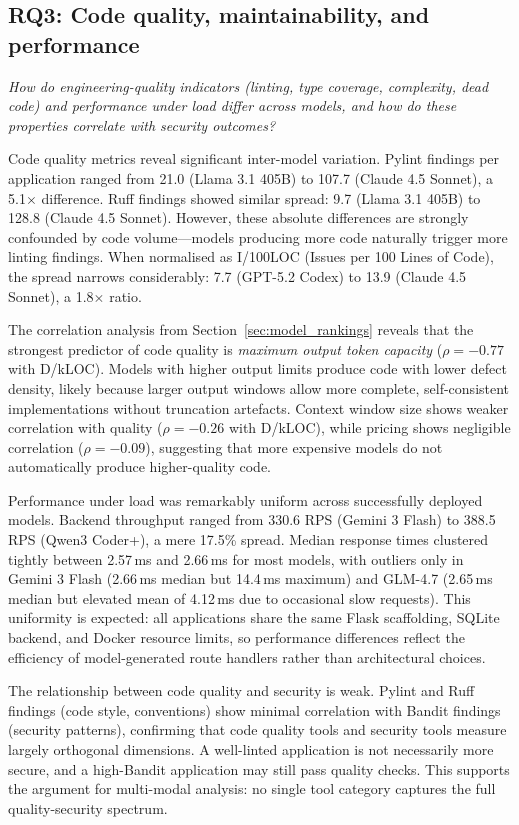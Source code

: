 \subsection{RQ3: Code quality, maintainability, and performance}

\textit{How do engineering-quality indicators (linting, type coverage, complexity, dead code) and performance under load differ across models, and how do these properties correlate with security outcomes?}

Code quality metrics reveal significant inter-model variation. Pylint findings per application ranged from 21.0 (Llama 3.1 405B) to 107.7 (Claude 4.5 Sonnet), a 5.1$\times$ difference. Ruff findings showed similar spread: 9.7 (Llama 3.1 405B) to 128.8 (Claude 4.5 Sonnet). However, these absolute differences are strongly confounded by code volume---models producing more code naturally trigger more linting findings. When normalised as I/100LOC (Issues per 100 Lines of Code), the spread narrows considerably: 7.7 (GPT-5.2 Codex) to 13.9 (Claude 4.5 Sonnet), a 1.8$\times$ ratio.

The correlation analysis from Section~\ref{sec:model_rankings} reveals that the strongest predictor of code quality is \textit{maximum output token capacity} ($\rho = -0.77$ with D/kLOC). Models with higher output limits produce code with lower defect density, likely because larger output windows allow more complete, self-consistent implementations without truncation artefacts. Context window size shows weaker correlation with quality ($\rho = -0.26$ with D/kLOC), while pricing shows negligible correlation ($\rho = -0.09$), suggesting that more expensive models do not automatically produce higher-quality code.

Performance under load was remarkably uniform across successfully deployed models. Backend throughput ranged from 330.6 RPS (Gemini 3 Flash) to 388.5 RPS (Qwen3 Coder+), a mere 17.5\% spread. Median response times clustered tightly between 2.57\,ms and 2.66\,ms for most models, with outliers only in Gemini 3 Flash (2.66\,ms median but 14.4\,ms maximum) and GLM-4.7 (2.65\,ms median but elevated mean of 4.12\,ms due to occasional slow requests). This uniformity is expected: all applications share the same Flask scaffolding, SQLite backend, and Docker resource limits, so performance differences reflect the efficiency of model-generated route handlers rather than architectural choices.

The relationship between code quality and security is weak. Pylint and Ruff findings (code style, conventions) show minimal correlation with Bandit findings (security patterns), confirming that code quality tools and security tools measure largely orthogonal dimensions. A well-linted application is not necessarily more secure, and a high-Bandit application may still pass quality checks. This supports the argument for multi-modal analysis: no single tool category captures the full quality-security spectrum.

